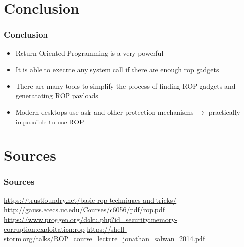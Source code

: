 \documentclass[11pt]{beamer}
\begin{document}
\section{Conclusion}
\begin{frame}
    \frametitle{Conclusion}
    \begin{itemize}
        \item Return Oriented Programming is a very powerful
        \item It is able to execute any system call if there are enough rop gadgets
        \item There are many tools to simplify the process of finding ROP gadgets and generatating ROP payloads
        \item Modern desktops use aslr and other protection mechanisms $\rightarrow$ practically impossible to use ROP
    \end{itemize}
\end{frame}

\section{Sources}
\begin{frame}
    \frametitle{Sources}
    \url{https://trustfoundry.net/basic-rop-techniques-and-tricks/}
    \url{http://gauss.ececs.uc.edu/Courses/c6056/pdf/rop.pdf}
    \url{https://www.proggen.org/doku.php?id=security:memory-corruption:exploitation:rop}
    \url{https://shell-storm.org/talks/ROP_course_lecture_jonathan_salwan_2014.pdf}
\end{frame}
\end{document}

